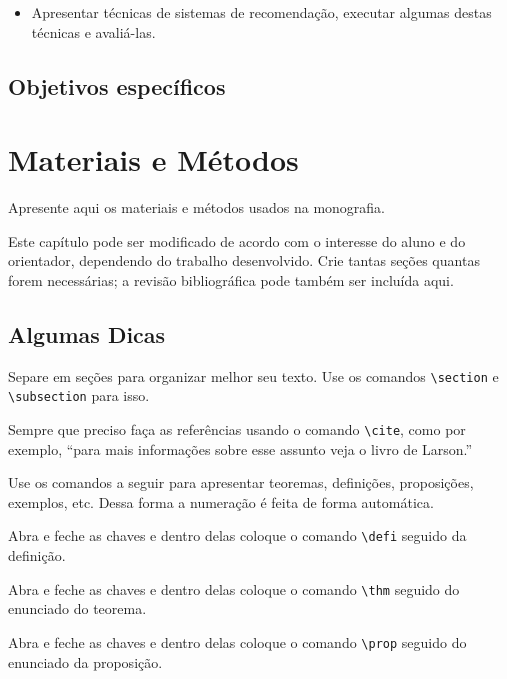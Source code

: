 \documentclass[12pt,a4paper,header]{abnt}
\begin{document}
\begin{itemize}

\item{Apresentar técnicas de sistemas de recomendação, executar algumas destas técnicas e avaliá-las.}

\end{itemize}

\section{Objetivos específicos}


\chapter{Materiais e Métodos}

Apresente aqui os materiais e métodos usados na monografia. 

Este capítulo pode ser modificado de acordo com o interesse do aluno e do orientador, dependendo do trabalho desenvolvido. Crie tantas seções quantas forem necessárias; a revisão bibliográfica pode também ser incluída aqui.


\section{Algumas Dicas}

Separe em seções para organizar melhor seu texto. Use os comandos \verb|\section| e \verb|\subsection| para isso. 

Sempre que preciso faça as referências usando o comando \verb|\cite|, como por exemplo, ``para mais informações sobre esse assunto veja o livro de Larson.''

Use os comandos a seguir para apresentar teoremas, definições, proposições, exemplos, etc. Dessa forma a numeração é feita de forma automática. 

{
Abra e feche as chaves e dentro delas coloque o comando \verb|\defi| seguido da definição. 
}

{\thm
Abra e feche as chaves e dentro delas coloque o comando \verb|\thm| seguido do enunciado do teorema. 
}

{\prop
Abra e feche as chaves e dentro delas coloque o comando \verb|\prop| seguido do enunciado da proposição.
}
\end{document}
